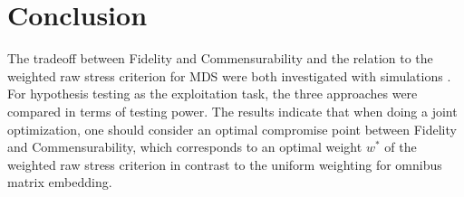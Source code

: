 \documentclass[11pt]{article} %
\begin{document}

\section{Conclusion}
 The tradeoff between Fidelity and Commensurability and the relation to the weighted raw stress criterion for MDS were both investigated with simulations .
   For  hypothesis testing as the exploitation task, the three approaches were compared in terms of testing power.
    The results indicate that when doing a joint optimization, one should consider an optimal compromise point between Fidelity and Commensurability,
       which corresponds to an optimal weight $w^*$ of the weighted raw stress criterion in contrast to the uniform weighting 
        for omnibus matrix embedding. 
        




\end{document}
